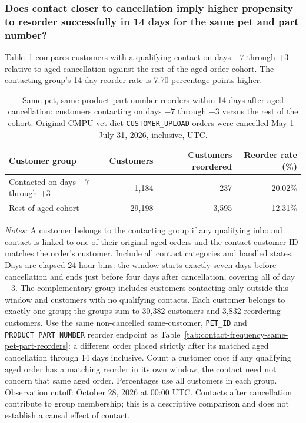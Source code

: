 \clearpage
\subsubsection{Does contact closer to cancellation imply higher propensity to re-order successfully in 14 days for the same pet and part number?}
Table~\ref{tab:contact-window-same-pet-part-reorders} compares customers with a
qualifying contact on days $-7$ through $+3$ relative to aged cancellation
against the rest of the aged-order cohort. The contacting group's 14-day reorder
rate is 7.70 percentage points higher.

\begin{table}[!htbp]
\centering
\caption{Same-pet, same-product-part-number reorders within 14 days after aged cancellation: customers contacting on days $-7$ through $+3$ versus the rest of the cohort. Original CMPU vet-diet \texttt{CUSTOMER\_UPLOAD} orders were cancelled May 1--July 31, 2026, inclusive, UTC.}
\label{tab:contact-window-same-pet-part-reorders}
\begin{tabular}{@{}lrrr@{}}
\toprule
Customer group & Customers & Customers reordered & Reorder rate (\%) \\
\midrule
Contacted on days $-7$ through $+3$ & 1,184 & 237 & 20.02\% \\
Rest of aged cohort & 29,198 & 3,595 & 12.31\% \\
\bottomrule
\end{tabular}

\begin{minipage}{\linewidth}
\footnotesize
\textit{Notes:} A customer belongs to the contacting group if any qualifying
inbound contact is linked to one of their original aged orders and the contact
customer ID matches the order's customer. Include all contact categories and
handled states. Days are elapsed 24-hour bins: the window starts exactly seven
days before cancellation and ends just before four days after cancellation,
covering all of day $+3$. The complementary group includes customers contacting
only outside this window and customers with no qualifying contacts. Each
customer belongs to exactly one group; the groups sum to 30,382 customers and
3,832 reordering customers. Use the same non-cancelled same-customer,
\texttt{PET\_ID} and \texttt{PRODUCT\_PART\_NUMBER} reorder endpoint as
Table~\ref{tab:contact-frequency-same-pet-part-reorders}: a different order
placed strictly after its matched aged cancellation through 14 days inclusive.
Count a customer once if any qualifying aged order has a matching reorder in
its own window; the contact need not concern that same aged order. Percentages
use all customers in each group. Observation cutoff: October 28, 2026 at 00:00
UTC. Contacts after cancellation contribute to group membership; this is a
descriptive comparison and does not establish a causal effect of contact.
\end{minipage}
\end{table}
